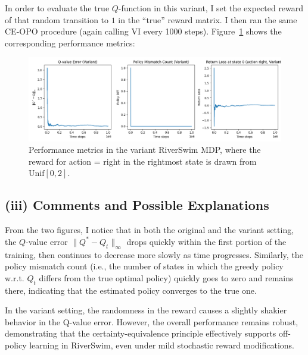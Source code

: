In order to evaluate the true $Q$-function in this variant, I set the expected reward of that random transition 
to $1$ in the ``true'' reward matrix. I then ran the same CE-OPO procedure (again calling VI every 1000 steps). 
Figure~\ref{fig:variant} shows the corresponding performance metrics:

\begin{figure}[H]
    \centering
    \includegraphics[width=1\textwidth]{Code/RiverSwim_CE-OPO_Variant.png}
    \caption{Performance metrics in the variant RiverSwim MDP, where the reward for action = right 
    in the rightmost state is drawn from $\mathrm{Unif}[0,2]$.}
    \label{fig:variant}
\end{figure}

\subsection*{(iii) Comments and Possible Explanations}
From the two figures, I notice that in both the original and the variant setting, the $Q$-value error $\|Q^*-Q_t\|_\infty$ 
drops quickly within the first portion of the training, then continues to decrease more slowly as time progresses. 
Similarly, the policy mismatch count (i.e., the number of states in which the greedy policy w.r.t. $Q_t$ differs from 
the true optimal policy) quickly goes to zero and remains there, indicating that the estimated policy converges to 
the true one. 

In the variant setting, the randomness in the reward causes a slightly shakier behavior in the Q-value error.
However, the overall performance remains robust, demonstrating that the certainty-equivalence principle effectively
supports off-policy learning in RiverSwim, even under mild stochastic reward modifications.